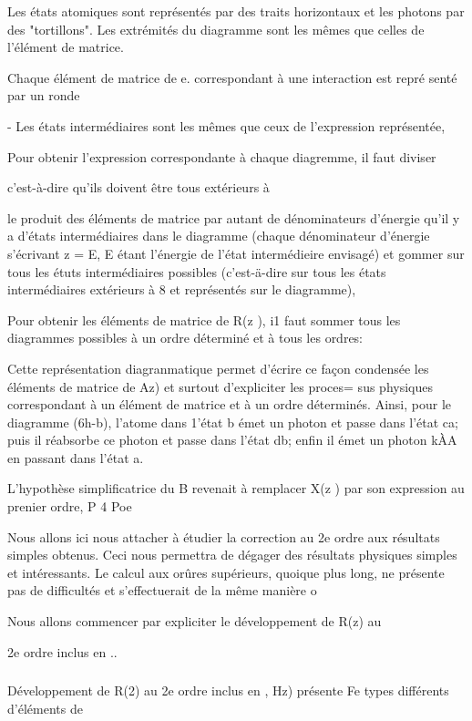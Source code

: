 Les états atomiques sont représentés par des traits horizontaux et les photons
par des "tortillons".
Les extrémités du diagramme sont les mêmes que celles de l'élément de matrice.

Chaque élément de matrice de e. correspondant à une interaction est repré
senté par un ronde

- Les états intermédiaires sont les mêmes que ceux de l'expression représentée,

Pour obtenir l'expression correspondante à chaque diagremme, il faut diviser

c'est-à-dire qu'ils doivent être tous extérieurs à

le produit des éléments de matrice par autant de dénominateurs d'énergie qu'il
y a d'états intermédiaires dans le diagramme (chaque dénominateur d'énergie
s'écrivant z = E, E étant l'énergie de l'état intermédieire envisagé) et
gommer sur tous les étuts intermédiaires possibles (c'est-ä-dire sur tous les
états intermédiaires extérieurs à 8 et représentés sur le diagramme),

Pour obtenir les éléments de matrice de R(z ), i1 faut sommer
tous les diagrammes possibles à un ordre déterminé et à tous les ordres:

Cette représentation diagranmatique permet d'écrire ce façon
condensée les éléments de matrice de Az) et surtout d'expliciter les proces=
sus physiques correspondant à un élément de matrice et à un ordre déterminés.
Ainsi, pour le diagramme (6h-b), l'atome dans 1'état b émet un photon
et passe dans l'état ca; puis il réabsorbe ce photon et passe dans l'état
db; enfin il émet un photon kÀA en passant dans l'état a.

L'hypothèse simplificatrice du  B revenait à remplacer X(z )
par son expression au prenier ordre, P 4 Poe

Nous allons ici nous attacher à étudier la correction au 2e
ordre aux résultats simples obtenus. Ceci nous permettra de dégager des résultats physiques simples et intéressants. Le calcul aux orûres supérieurs, quoique
plus long, ne présente pas de difficultés et s'effectuerait de la même manière o

Nous allons commencer par expliciter le développement de R(z) au

2e ordre inclus en ..

\subsubsection{} Développement de R(2) au 2e ordre inclus en ,%
Hz) présente Fe types différents d'éléments de

